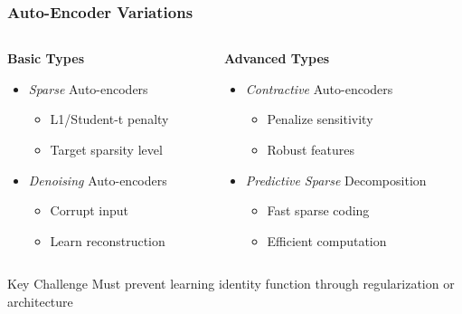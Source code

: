 \documentclass{beamer}
\begin{document}
\begin{frame}
\frametitle{Auto-Encoder Variations}
\begin{columns}
    \begin{column}{0.48\textwidth}
        \textbf{Basic Types}
        \begin{itemize}
        \item \textit{Sparse} Auto-encoders
            \begin{itemize}
            \item L1/Student-t penalty
            \item Target sparsity level
            \end{itemize}
        \item \textit{Denoising} Auto-encoders
            \begin{itemize}
            \item Corrupt input
            \item Learn reconstruction
            \end{itemize}
        \end{itemize}
    \end{column}
    \pause

    \begin{column}{0.48\textwidth}
        \textbf{Advanced Types}
        \begin{itemize}
        \item \textit{Contractive} Auto-encoders
            \begin{itemize}
            \item Penalize sensitivity
            \item Robust features
            \end{itemize}
        \item \textit{Predictive Sparse} Decomposition
            \begin{itemize}
            \item Fast sparse coding
            \item Efficient computation
            \end{itemize}
        \end{itemize}
    \end{column}
\end{columns}
\pause

\begin{alertblock}{Key Challenge}
Must prevent learning identity function through regularization or architecture
\end{alertblock}
\end{frame}
\end{document}
